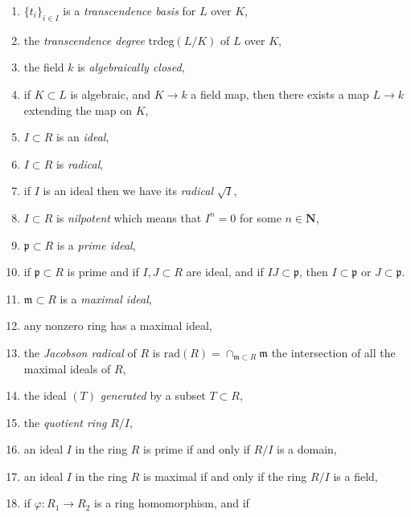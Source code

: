 \begin{enumerate}
\label{item-field-extension-algebraic}
\item $\{t_i\}_{i\in I}$ is a {\it transcendence basis} for $L$ over $K$,
\label{item-transcendence-basis}
\item the {\it transcendence degree} $\text{trdeg}(L/K)$ of $L$
over $K$,
\label{item-transcendence-degree}
\item the field $k$ is {\it algebraically closed},
\label{item-algebraically-closed}
\item if $K \subset L$ is algebraic, and $K \to k$ a field map,
then there exists a map $L \to k$ extending the map on $K$,
\label{item-extend-into-algebraically-closed}
\item $I \subset R$ is an {\it ideal},
\label{item-ideal}
\item $I \subset R$ is {\it radical},
\label{item-ideal-radical}
\item if $I$ is an ideal then we have its {\it radical} $\sqrt{I}$,
\label{item-radical-ideal}
\item $I \subset R$ is {\it nilpotent} which means that $I^n = 0$ for
some $n \in \mathbf{N}$,
\label{item-ideal-nilpotent}
\item $\mathfrak p \subset R$ is a {\it prime ideal},
\label{item-prime-ideal}
\item if $\mathfrak p \subset R$ is prime and if $I, J \subset R$
are ideal, and if $IJ\subset \mathfrak p$, then
$I \subset \mathfrak p$ or $J \subset \mathfrak p$.
\label{item-prime-product-ideals}
\item $\mathfrak m \subset R$ is a {\it maximal ideal},
\label{item-maximal-ideal}
\item any nonzero ring has a maximal ideal,
\label{item-exists-maximal-ideal}
\item the {\it Jacobson radical} of $R$ is $\text{rad}(R) =
\cap_{\mathfrak m \subset R} \mathfrak m$ the intersection
of all the maximal ideals of $R$,
\label{item-jacobson-radical}
\item the ideal $(T)$ {\it generated} by a subset $T \subset R$,
\label{item-ideal-generated-by}
\item the {\it quotient ring} $R/I$,
\label{item-quotient-ring}
\item an ideal $I$ in the ring $R$ is prime if and only if $R/I$
is a domain,
\label{item-characterize-prime-ideal}
\item an ideal $I$ in the ring $R$ is maximal if and only if the
ring $R/I$ is a field,
\label{item-characterize-maximal-ideal}
\item if $\varphi : R_1 \to R_2$ is a ring homomorphism, and if

\end{enumerate}
